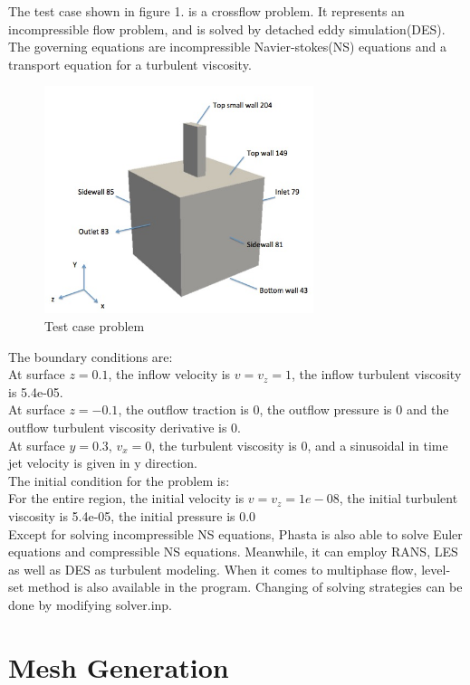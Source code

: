 \documentclass{article}
\begin{document}
The test case shown in figure 1. is a crossflow problem. It represents an incompressible flow problem, and is solved by detached eddy simulation(DES). The governing equations are incompressible Navier-stokes(NS) equations and a transport equation for a turbulent viscosity. 
\begin{figure}[h!]
  \centering
    \includegraphics[width=0.7\textwidth]{fig1}
  \caption{Test case problem}
\end{figure}
The boundary conditions are:\\
At surface $z=0.1$, the inflow velocity is $v = v_z= 1$, the inflow turbulent viscosity is 5.4e-05.\\
At surface $z=-0.1$, the outflow traction is 0, the outflow pressure is 0 and the outflow turbulent viscosity derivative is 0. \\
At surface $y=0.3$, $v_x=0$, the turbulent viscosity is 0, and a sinusoidal  in time jet velocity is given in y direction.\\

The initial condition for the problem is: \\
For the entire region, the initial velocity is $v = v_z = 1e-08$, the initial turbulent viscosity is 5.4e-05, the initial pressure is 0.0 \\ 

Except for solving incompressible NS equations, Phasta is also able to solve Euler equations and compressible NS equations. Meanwhile, it can employ RANS, LES as well as DES as turbulent modeling. When it comes to multiphase flow, level-set method is also available in the program. Changing of solving strategies can be done by modifying solver.inp.

\section{Mesh Generation}
\end{document}
